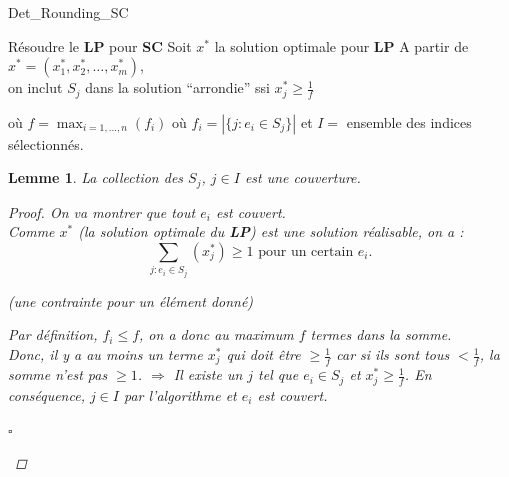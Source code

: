 \documentclass{article}
\newcommand{\titre}[1]{\textcolor{title}{#1}}
\newcommand{\cqfd}{\begin{flushright}$\square$\end{flushright}}
\newtheorem{lemme}{Lemme}[section]
\newtheorem{proof}{Preuve}[section]
\begin{document}
\begin{sffamily}
\vspace{5em}

\begin{algorithm}[h!]
\caption{Det\_Rounding\_SC}
\begin{algorithmic}[1]
\STATE Résoudre le \textbf{LP} pour \textbf{\titre{SC}}
\STATE Soit $x^*$ la solution optimale pour \textbf{LP}
\STATE A partir de $x^* = (x^*_1,x^*_2, \ldots, x^*_m)$,\\
on inclut $S_j$ dans la solution ``arrondie'' ssi $x^*_j \geq \frac{1}{f}$
\end{algorithmic}
\end{algorithm}

où $f = \max_{i=1,...,n} (f_i)$ où $f_i = |\{j:e_i \in S_j\}|$ et $I =$ ensemble des indices sélectionnés.

\begin{lemme}
La collection des $S_j$, $j \in I$ est une couverture.
\begin{proof}
On va montrer que tout $e_i$ est couvert.\\
Comme $x^*$ \textit{(la solution optimale du \textbf{LP})} est une solution réalisable, on a :
$$\sum_{j : e_i\in S_j} (x^*_j) \geq 1\text{ pour un certain } e_i.$$
\begin{center}\textit{(une contrainte pour un élément donné)}\end{center}
Par définition, $f_i \leq f$, on a donc au maximum $f$ termes dans la somme. \\
Donc, il y a au moins un terme $x^*_j$ qui doit être $\geq \frac{1}{f}$ car si ils sont tous $<\frac{1}{f}$, la somme n'est pas $\geq 1$.
$\Rightarrow$ Il existe un $j$ tel que $e_i \in S_j$ et $x^*_j \geq \frac{1}{f}$.
En conséquence, $j \in I$ par l'algorithme et $e_i$ est couvert.
\cqfd
\end{proof}
\end{lemme}


\end{sffamily}
\end{document}
